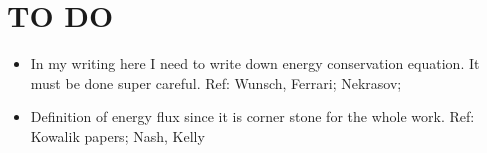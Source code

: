 \newpage
\section{TO DO}
\begin{itemize}
\item In my writing here I need to write down energy conservation equation. It must be done super careful. Ref: Wunsch, Ferrari; Nekrasov; 
\item Definition of energy flux since it is corner stone for the whole work. Ref: Kowalik papers; Nash, Kelly

\end{itemize}





